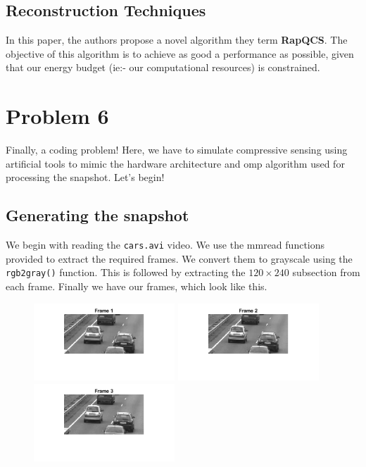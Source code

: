 \documentclass[a4paper,11pt]{article}
\numberwithin{definition}{section}
\numberwithin{mytheorem}{subsection}
\begin{document}
\subsection{Reconstruction Techniques}
In this paper, the authors propose a novel algorithm they term \textbf{RapQCS}. The objective of this algorithm is to achieve as good a performance as possible, given that our energy budget (ie:- our computational resources) is constrained.

\newpage

\section{Problem 6}

Finally, a coding problem! Here, we have to simulate compressive sensing using artificial tools to mimic the hardware architecture and omp algorithm used for processing the snapshot. Let's begin!

\subsection{Generating the snapshot}

We begin with reading the \verb|cars.avi| video. We use the mmread functions provided to extract the required frames.
We convert them to grayscale using the \verb|rgb2gray()| function. This is followed by extracting the $120\times240$ subsection from each frame. Finally we have our frames, which look like this.

\begin{figure}[!h]
    \centering
    \includegraphics[width=200px]{"Frame 1.png"}
    \includegraphics[width=200px]{"Frame 2.png"}
    \includegraphics[width=200px]{"Frame 3.png"}
\end{figure}
\end{document}
